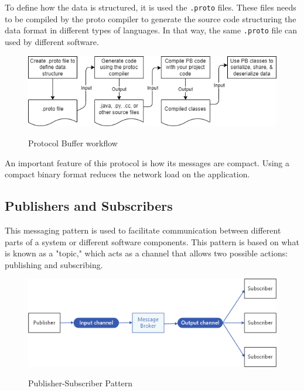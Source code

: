 \documentclass[../monografia.tex]{subfiles}
\begin{document}
To define how the data is structured, it is used the \texttt{.proto} files. These files needs to be compiled by the proto compiler to generate the source code structuring the data format in different types of languages. In that way, the same \texttt{.proto} file can used by different software.

\begin{figure}[h]
\centering
    \caption{Protocol Buffer workflow}
    \centering %
    \includegraphics[width=14cm]{protobuf_workflow.png}
    \label{fig: protobuf_workflow}
\end{figure}

An important feature of this protocol is how its messages are compact. Using a compact binary format reduces the network load on the application.

\subsection{Publishers and Subscribers}
This messaging pattern \cite{publisher_subscriber} is used to facilitate communication between different parts of a system or different software components. This pattern is based on what is known as a "topic," which acts as a channel that allows two possible actions: publishing and subscribing.

\begin{figure}[h]
\centering
    \caption{Publisher-Subscriber Pattern}
    \centering %
    \includegraphics[width=14cm]{publish-subscribe.png}
    \label{fig: publisher subscriber pattern}
\end{figure}
\end{document}
